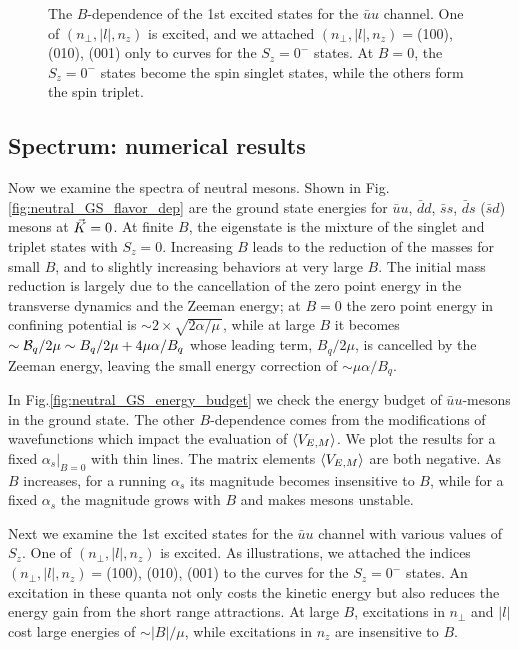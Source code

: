 \begin{figure}
\caption{ 
The $B$-dependence of the 1st excited states for the $\bar{u}u$ channel. One of $(n_\perp, |l|, n_z)$ is excited, and we attached $(n_\perp, |l|, n_z) = $(100), (010), (001) only to curves for the $S_z=0^-$ states. At $B=0$, the $S_z=0^-$ states become the spin singlet states, while the others form the spin triplet. }
\label{fig:neutral_1st_excited}       
\end{figure}



\subsection{Spectrum: numerical results}
\label{sec:numerical_neutral}

Now we examine the spectra of neutral mesons.
Shown in Fig.\ref{fig:neutral_GS_flavor_dep} are the ground state energies for $\bar{u}u$, $\bar{d}d$, $\bar{s}s$, $\bar{d}s$ ($\bar{s}d$) mesons at $\vec{K}=0$. 
At finite $B$, the eigenstate is the mixture of the singlet and triplet states with $S_z=0$. 
Increasing $B$ leads to the reduction of the masses for small $B$, and to slightly increasing behaviors at very large $B$. 
The initial mass reduction is largely due to the cancellation of the zero point energy in the transverse dynamics and the Zeeman energy; 
at $B=0$ the zero point energy in confining potential is $\sim 2\times \sqrt{  2\alpha / \mu \,} $, 
while at large $B$ it becomes $\sim \mathcal{B}_q/2\mu \sim B_q/2\mu + 4\mu \alpha /B_q$ whose leading term, $B_q/2\mu$, is cancelled by the Zeeman energy, leaving the small energy correction of $\sim \mu \alpha /B_q$. 

In Fig.\ref{fig:neutral_GS_energy_budget} we check the energy budget of $\bar{u}u$-mesons in the ground state. 
The other $B$-dependence comes from the modifications of wavefunctions which impact the evaluation of $\langle V_{E,M} \rangle$. 
We plot the results for a fixed $\alpha_s |_{B=0}$ with thin lines.
The matrix elements $\langle V_{E,M} \rangle$ are both negative.
As $B$ increases, for a running $\alpha_s$ its magnitude becomes insensitive to $B$, while for a fixed $\alpha_s$ the magnitude grows with $B$ and makes mesons unstable.

Next we examine the 1st excited states for the $\bar{u}u$ channel with various values of $S_z$. 
One of $(n_\perp, |l|, n_z)$ is excited. 
As illustrations, we attached the indices $(n_\perp, |l|, n_z) = $(100), (010), (001) to the curves for the $S_z = 0^-$ states. 
An excitation in these quanta not only costs the kinetic energy but also reduces the energy gain from the short range attractions. 
At large $B$, excitations in $n_\perp$ and $|l|$ cost large energies of $\sim |B|/\mu$, while excitations in $n_z$ are insensitive to $B$.



